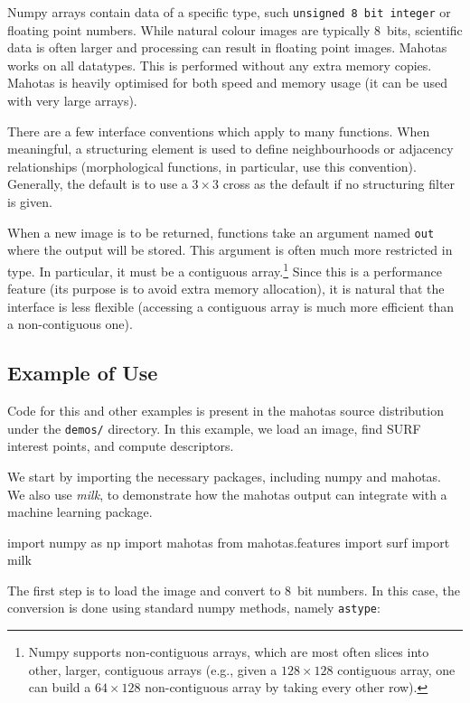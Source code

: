 \documentclass{scrartcl}
\let\code\texttt
\begin{document}
Numpy arrays contain data of a specific type, such \code{unsigned 8 bit
integer} or floating point numbers. While natural colour images are typically
8~bits, scientific data is often larger and processing can result in floating
point images. Mahotas works on all datatypes. This is performed without any
extra memory copies. Mahotas is heavily optimised for both speed and memory
usage (it can be used with very large arrays).

There are a few interface conventions which apply to many functions. When
meaningful, a structuring element is used to define neighbourhoods or adjacency
relationships (morphological functions, in particular, use this convention).
Generally, the default is to use a $3 \times 3$ cross as the default if no
structuring filter is given.

When a new image is to be returned, functions take an argument named \code{out}
where the output will be stored. This argument is often much more restricted in
type. In particular, it must be a contiguous array.\footnote{Numpy supports
non-contiguous arrays, which are most often slices into other, larger,
contiguous arrays (e.g., given a $128 \times 128$ contiguous array, one can
build a $64 \times 128$ non-contiguous array by taking every other row).} Since
this is a performance feature (its purpose is to avoid extra memory
allocation), it is natural that the interface is less flexible (accessing a
contiguous array is much more efficient than a non-contiguous one).

\subsection{Example of Use}

Code for this and other examples is present in the mahotas source distribution
under the \texttt{demos/} directory. In this example, we load an image, find
SURF interest points, and compute descriptors.

We start by importing the necessary packages, including numpy and mahotas. We
also use \textit{milk}, to demonstrate how the mahotas output can integrate
with a machine learning package.

\begin{python}
import numpy as np
import mahotas
from mahotas.features import surf
import milk
\end{python}

The first step is to load the image and convert to 8~bit numbers. In this
case, the conversion is done using standard numpy methods, namely
\code{astype}:
\end{document}
